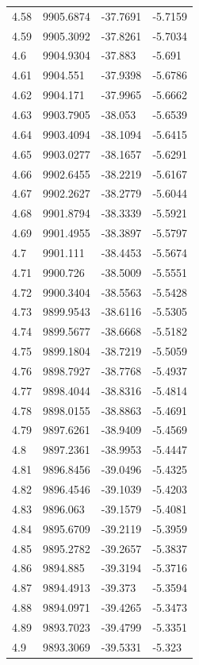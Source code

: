 \begin{table}[H]
\begin{tabular}{llll}
4.58 & 9905.6874 & -37.7691 & -5.7159 \\
4.59 & 9905.3092 & -37.8261 & -5.7034 \\
4.6 & 9904.9304 & -37.883 & -5.691 \\
4.61 & 9904.551 & -37.9398 & -5.6786 \\
4.62 & 9904.171 & -37.9965 & -5.6662 \\
4.63 & 9903.7905 & -38.053 & -5.6539 \\
4.64 & 9903.4094 & -38.1094 & -5.6415 \\
4.65 & 9903.0277 & -38.1657 & -5.6291 \\
4.66 & 9902.6455 & -38.2219 & -5.6167 \\
4.67 & 9902.2627 & -38.2779 & -5.6044 \\
4.68 & 9901.8794 & -38.3339 & -5.5921 \\
4.69 & 9901.4955 & -38.3897 & -5.5797 \\
4.7 & 9901.111 & -38.4453 & -5.5674 \\
4.71 & 9900.726 & -38.5009 & -5.5551 \\
4.72 & 9900.3404 & -38.5563 & -5.5428 \\
4.73 & 9899.9543 & -38.6116 & -5.5305 \\
4.74 & 9899.5677 & -38.6668 & -5.5182 \\
4.75 & 9899.1804 & -38.7219 & -5.5059 \\
4.76 & 9898.7927 & -38.7768 & -5.4937 \\
4.77 & 9898.4044 & -38.8316 & -5.4814 \\
4.78 & 9898.0155 & -38.8863 & -5.4691 \\
4.79 & 9897.6261 & -38.9409 & -5.4569 \\
4.8 & 9897.2361 & -38.9953 & -5.4447 \\
4.81 & 9896.8456 & -39.0496 & -5.4325 \\
4.82 & 9896.4546 & -39.1039 & -5.4203 \\
4.83 & 9896.063 & -39.1579 & -5.4081 \\
4.84 & 9895.6709 & -39.2119 & -5.3959 \\
4.85 & 9895.2782 & -39.2657 & -5.3837 \\
4.86 & 9894.885 & -39.3194 & -5.3716 \\
4.87 & 9894.4913 & -39.373 & -5.3594 \\
4.88 & 9894.0971 & -39.4265 & -5.3473 \\
4.89 & 9893.7023 & -39.4799 & -5.3351 \\
4.9 & 9893.3069 & -39.5331 & -5.323 \\

\end{tabular}
\end{table}
